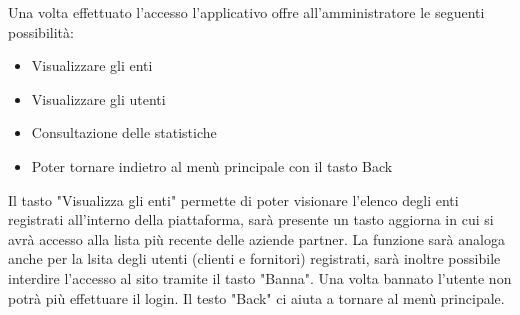 Una volta effettuato l'accesso l'applicativo offre all'amministratore le seguenti possibilità:
\begin{itemize}
    \item Visualizzare gli enti
    \item Visualizzare gli utenti
    \item Consultazione delle statistiche
    \item Poter tornare indietro al menù principale con il tasto Back
\end{itemize}

Il tasto "Visualizza gli enti" permette di poter visionare l'elenco degli enti registrati all'interno della piattaforma, sarà presente un tasto aggiorna in cui si avrà accesso alla lista più recente delle aziende partner.
La funzione sarà analoga anche per la lsita degli utenti (clienti e fornitori) registrati, sarà inoltre possibile interdire l'accesso al sito tramite il tasto "Banna". Una volta bannato l'utente non potrà più effettuare il login.
Il testo "Back" ci aiuta a tornare al menù principale.

